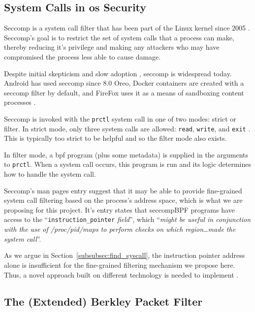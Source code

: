 \subsection{System Calls in \ac{os} Security}

Seccomp is a system call filter that has been part of the Linux kernel since
2005 \cite{arcangeli_seccomp_2005}. Seccomp's goal is to restrict the set of
system calls that a process can make, thereby reducing it's privilege and making
any attackers who may have compromised the process less able to cause damage.

Despite initial skepticism and slow adoption
\cite{TORVALDS_ANYONE_USES_SECCOMP}, seccomp is widespread today. Android has
used seccomp since 8.0 Oreo, Docker containers are
created with a seccomp filter by default, and FireFox uses it as a means of
sandboxing content processes \cite{android_seccomp_oreo, docker_seccomp,
firefox_seccomp}.

Seccomp is invoked with the \texttt{prctl} system call in one of two modes: strict
or filter. In strict mode, only three system calls are allowed: \texttt{read},
\texttt{write}, and \texttt{exit} \cite{MAN_PAGES_SECCOMP}. This is typically
too strict to be helpful and so the filter mode also exists.

In filter mode, a \ac{bpf} program (plus some metadata) is supplied in the arguments to
\texttt{prctl}. When a system call occurs, this program is run and its logic
determines how to handle the system call. 

Seccomp's man pages entry suggest that it may be able to provide fine-grained
system call filtering based on the process's address space, which is what we
are proposing for this project. It's entry states that seccompBPF programs have
access to the ``\texttt{instruction\_pointer} \textit{field}'', which
``\textit{might be useful in conjunction with the use of /proc/pid/maps to
perform checks on which region\dots made the system call}''.

As we argue in Section~\ref{subsubsec:find_syscall}, the instruction pointer
address alone is insufficient for the fine-grained filtering mechanism we
propose here. Thus, a novel approach built on different technology is needed
to implement \af. 

\subsection{The (Extended) Berkley Packet Filter}\label{subsec:bgd-bpf}

